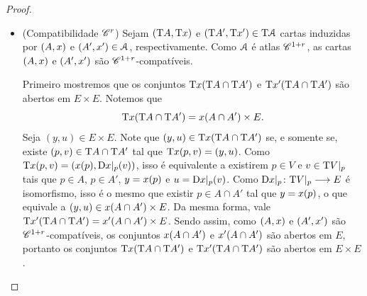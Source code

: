 \begin{proof}
\begin{itemize}
	\item (Compatibilidade $\mathscr{C}^r$) Sejam $(\mathrm{T} A, \mathrm{T} x)$ e $(\mathrm{T} A', \mathrm{T} x') \in \mathrm{T} \mathcal{A}$ cartas induzidas por $(A, x)$ e $(A', x') \in \mathcal{A}$, respectivamente. Como $\mathcal{A}$ é atlas $\mathscr{C}^{1+r}$, as cartas $(A, x)$ e $(A', x')$ são $\mathscr{C}^{1+r}$-compatíveis.

	Primeiro mostremos que os conjuntos $\mathrm{T} x(\mathrm{T} A \cap \mathrm{T} A')$  e $\mathrm{T} x'(\mathrm{T} A \cap \mathrm{T} A')$ são abertos em $E \times E$. Notemos que
		\begin{equation*}
		\mathrm{T} x(\mathrm{T} A \cap \mathrm{T} A') = x(A \cap A') \times E.
		\end{equation*}
	Seja $(y,u) \in E \times E$. Note que $(y, u) \in \mathrm{T} x(\mathrm{T} A \cap \mathrm{T} A')$ se, e somente se, existe $(p,v) \in \mathrm{T} A \cap \mathrm{T} A'$ tal que $\mathrm{T} x(p,v) = (y,u)$. Como $\mathrm{T} x(p,v) = (x(p), \mathrm{D}x|_p(v))$, isso é equivalente a existirem $p \in V$ e $v \in \mathrm{T} V|_p$ tais que $p \in A$, $p \in A'$, $y = x(p)$ e $u = \mathrm{D}x|_p(v)$. Como $\mathrm{D} x|_p\colon \allowbreak \mathrm{T} V|_p \longrightarrow E$ é isomorfismo, isso é o mesmo que existir $p \in A \cap A'$ tal que $y=x(p)$, o que equivale a $(y,u) \in x(A \cap A') \times E$.
%	
	Da mesma forma, vale $\mathrm{T} x'(\mathrm{T} A \cap \mathrm{T} A') = x'(A \cap A') \times E$. Sendo assim, como $(A, x)$ e $(A', x')$ são $\mathscr{C}^{1+r}$-compatíveis, os conjuntos $x(A \cap A')$ e $x'(A \cap A')$ são abertos em $E$, portanto os conjuntos $\mathrm{T} x(\mathrm{T} A \cap \mathrm{T} A')$ e $\mathrm{T} x'(\mathrm{T} A \cap \mathrm{T} A')$ são abertos em $E \times E$.
	

\end{itemize}
\end{proof}

